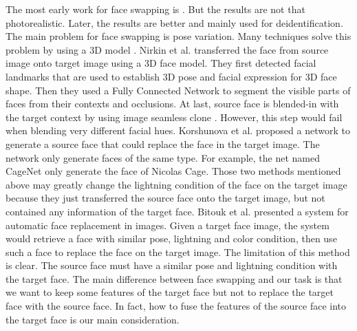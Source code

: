 The most early work for face swapping is \cite{exchface}. But the results are not that photorealistic. Later, the results are better \cite{de1,de2,de3,de4} and mainly used for deidentification. The main problem for face swapping is pose variation. 
Many techniques solve this problem by using a 3D model \cite{de3,3d1,onseg}. Nirkin et al. \cite{onseg} transferred the face from source image onto target image using a 3D face model. They first detected facial landmarks that are used to establish 3D pose and facial expression for 3D face shape. Then they used a Fully Connected Network to segment the visible parts of faces from their contexts and occlusions. At last, source face is blended-in with the target context by using image seamless clone \cite{pie}. However, this step would fail when blending very different facial hues. Korshunova et al. \cite{faceswapping} proposed a network to generate a source face that could replace the face in the target image. The network only generate faces of the same type. For example, the net named CageNet only generate the face of Nicolas Cage. Those two methods mentioned above may greatly change the lightning condition of the face on the target image because they just transferred the source face onto the target image, but not contained any information of the target face. Bitouk et al. \cite{autorep} presented a system for automatic face replacement in images. Given a target face image, the system would retrieve a face with similar pose, lightning and color condition, then use such a face to replace the face on the target image. The limitation of this method is clear. The source face must have a similar pose and lightning condition with the target face. 
%
The main difference between face swapping and our task is that we want to keep some features of the target face but not to replace the target face with the source face. In fact, how to fuse the features of the source face into the target face is our main consideration. 
